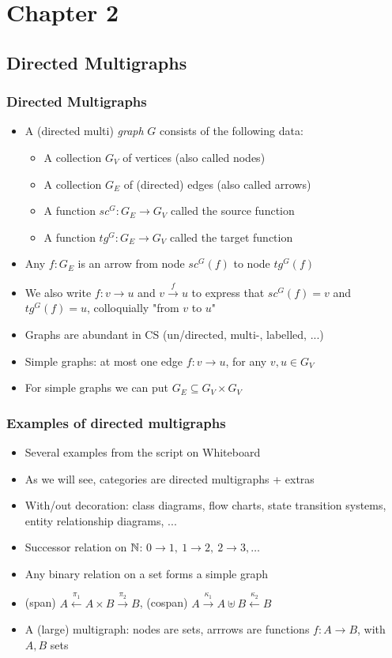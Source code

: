 \documentclass[handout]{beamer}
\title[INF223 presentations]{}
\begin{document}
\section{Chapter 2}
\subsection{Directed Multigraphs}
 
\frame
  {   
    \frametitle{Directed Multigraphs}\label{Ch2:DMG}

 \begin{itemize}[<+->]
\item A (directed multi) \emph{graph} $G$ consists of the following data:
   \begin{itemize}[<+->]
\item A collection $G_V$ of vertices (also called nodes)
\item A collection $G_E$ of (directed) edges (also called arrows)
\item A function $sc^G : G_ E \to G_V$ called the source function
\item A function $tg^G : G_ E \to G_V$ called the target function
   \end{itemize}
\item Any $f:G_E$ is an arrow from node $sc^G(f)$ to node $tg^G(f)$
\item We also write $f:v\to u$ and $v \stackrel{f}{\to} u$ to express
that $sc^G(f)=v$ and $tg^G(f)=u$, colloquially  "from $v$ to $u$"
\item Graphs are abundant in CS (un/directed, multi-, labelled, ...)
\item Simple graphs: at most one edge $f:v\to u$, for any $v,u\in G_ V$
\item For simple graphs we can put $G_ E \subseteq G_V\times G_V$
 \end{itemize}

 }

\frame
  {   
    \frametitle{Examples of  directed multigraphs}\label{Ch2:DMGexamples}

 \begin{itemize}[<+->]
\item Several examples from the script on Whiteboard
\item As we will see, categories are directed multigraphs + extras
\item With/out decoration: class diagrams, flow charts, state transition systems,
entity relationship diagrams, ...
\item Successor relation on $\mathbb{N}$: $0\to 1,~1\to 2,~2\to 3,\ldots$
\item Any binary relation on a set forms a simple graph
\item (span) $A\stackrel{\pi_1}{\leftarrow} A\times B \stackrel{\pi_2}{\to} B$,
(cospan) $A\stackrel{\kappa_1}{\to} A\uplus B \stackrel{\kappa_2}{\leftarrow} B$
\item A (large) multigraph: nodes are sets, arrrows are functions $f:A\to B$,
with $A,B$ sets
 \end{itemize}

 }
\end{document}
